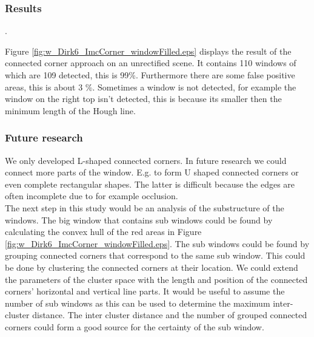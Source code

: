 \subsubsection{Results}
\label{sec:results}.


\clearpage

Figure \ref{fig:w_Dirk6_ImcCorner_windowFilled.eps} displays the result of the
connected corner approach on an unrectified scene.  It contains 110 windows of
which are 109 detected, this is 99\%. Furthermore there are some false positive
areas, this is about 3 \%.
Sometimes a window is not detected, for example the window on the right top
isn't detected, this is because its smaller then the minimum length of the
Hough line.\\


\subsubsection{Future research} %
We only developed L-shaped connected corners. In future research we could
connect more parts of the window. E.g. to form U shaped connected corners or
even complete rectangular shapes. The latter is difficult because the edges are
often incomplete due to for example occlusion.\\

The next step in this study would be an analysis of the substructure
of the windows.  The big window that contains sub windows could be
found by calculating the convex hull of the red areas in Figure
\ref{fig:w_Dirk6_ImcCorner_windowFilled.eps}.  The sub windows could be found
by grouping connected corners that correspond to the same sub window.
This could be done by clustering the connected corners at their location.
We could extend the parameters of the cluster space with 
the length and position of the connected corners' horizontal and vertical line
parts.
It would be useful to assume the number of sub windows as this can be used to
determine the maximum inter-cluster distance.  
The inter cluster distance and the number of grouped connected corners could form a good source for
the certainty of the sub window.\\




